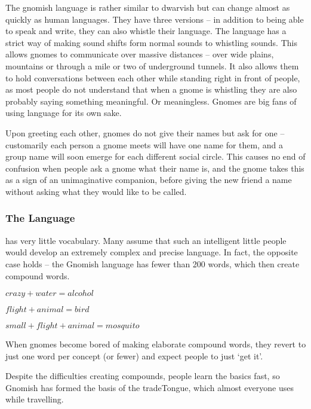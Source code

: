 \begin{multicols}{2}
The gnomish language is rather similar to dwarvish but can change almost as quickly as human languages.
They have three versions -- in addition to being able to speak and write, they can also whistle their language.
The language has a strict way of making sound shifts form normal sounds to whistling sounds.
This allows gnomes to communicate over massive distances -- over wide plains, mountains or through a mile or two of underground tunnels.
It also allows them to hold conversations between each other while standing right in front of people, as most people do not understand that when a gnome is whistling they are also probably saying something meaningful.
Or meaningless.
Gnomes are big fans of using language for its own sake. 

Upon greeting each other, gnomes do not give their names but ask for one -- customarily each person a gnome meets will have one name for them, and a group name will soon emerge for each different social circle. This causes no end of confusion when people ask a gnome what their name is, and the gnome takes this as a sign of an unimaginative companion, before giving the new friend a name without asking what they would like to be called.

\subsubsection{The Language}
has very little vocabulary.
Many assume that such an intelligent little people would develop an extremely complex and precise language.
In fact, the opposite case holds -- the Gnomish language has fewer than 200 words, which then create compound words.

$crazy + water = alcohol$

$flight + animal = bird$

$small + flight + animal = mosquito$

When gnomes become bored of making elaborate compound words, they revert to just one word per concept (or fewer) and expect people to just `get it'.

Despite the difficulties creating compounds, people learn the basics fast, so Gnomish has formed the basis of the \gls{tradeTongue}, which almost everyone uses while travelling.


\end{multicols}
